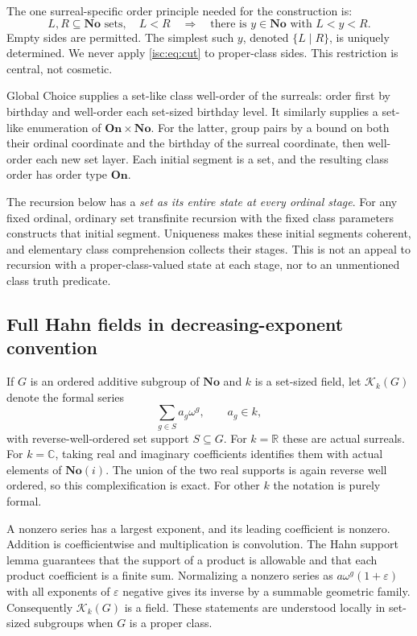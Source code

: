 \documentclass[11pt,letterpaper]{article}
\theoremstyle{definition}
\theoremstyle{remark}
\newcommand{\No}{\mathbf{No}}
\newcommand{\On}{\mathbf{On}}
\newcommand{\SC}{\No(i)}
\newcommand{\R}{\mathbb R}
\newcommand{\C}{\mathbb C}
\newcommand{\K}[2]{\mathcal K_{#1}(#2)}
\numberwithin{equation}{section}
\begin{document}
The one surreal-specific order principle needed for the construction is:
\begin{equation}\label{isc:eq:cut}
 L,R\subseteq\No\text{ sets},\quad L<R
 \quad\Longrightarrow\quad
 \text{there is }y\in\No\text{ with }L<y<R.
\end{equation}
Empty sides are permitted. The simplest such $y$, denoted $\{L\mid R\}$,
is uniquely determined. We never apply \eqref{isc:eq:cut} to proper-class sides.
This restriction is central, not cosmetic.

Global Choice supplies a set-like class well-order of the surreals: order
first by birthday and well-order each set-sized birthday level. It similarly
supplies a set-like enumeration of $\On\times\No$. For the latter, group
pairs by a bound on both their ordinal coordinate and the birthday of the
surreal coordinate, then well-order each new set layer. Each initial segment
is a set, and the resulting class order has order type $\On$.

The recursion below has a \emph{set as its entire state at every ordinal
stage}. For any fixed ordinal, ordinary set transfinite recursion with the
fixed class parameters constructs that initial segment. Uniqueness makes
these initial segments coherent, and elementary class comprehension collects
their stages. This is not an appeal to recursion with a proper-class-valued
state at each stage, nor to an unmentioned class truth predicate.

\subsection{Full Hahn fields in decreasing-exponent convention}

If $G$ is an ordered additive subgroup of $\No$ and $k$ is a set-sized
field, let $\K{k}{G}$ denote the formal series
\[
 \sum_{g\in S}a_g\omega^g,\qquad a_g\in k,
\]
with reverse-well-ordered set support $S\subseteq G$. For $k=\R$ these
are actual surreals. For $k=\C$, taking real and imaginary coefficients
identifies them with actual elements of $\SC$. The union of the two real
supports is again reverse well ordered, so this complexification is exact.
For other $k$ the notation is purely formal.

A nonzero series has a largest exponent, and its leading coefficient is
nonzero. Addition is coefficientwise and multiplication is convolution.
The Hahn support lemma guarantees that the support of a product is allowable
and that each product coefficient is a finite sum. Normalizing a nonzero
series as $a\omega^g(1+\varepsilon)$ with all exponents of $\varepsilon$
negative gives its inverse by a summable geometric family. Consequently
$\K{k}{G}$ is a field. These statements are understood locally in set-sized
subgroups when $G$ is a proper class.
\end{document}
